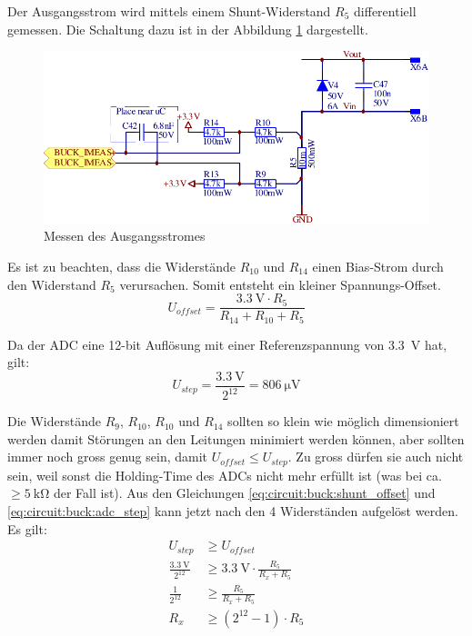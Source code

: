 Der  Ausgangsstrom  wird  mittels  einem  Shunt-Widerstand  $R_5$  differentiell
gemessen.  Die  Schaltung dazu ist in der Abbildung \ref{fig:circuit:buck:imeas}
dargestellt.

\begin{figure}[th!]
    \center
    \includegraphics[width=.85\textwidth]{images/circuit/buck-imeas.pdf}
    \caption{Messen des Ausgangsstromes}
    \label{fig:circuit:buck:imeas}
\end{figure}

Es  ist  zu  beachten,  dass  die  Widerst\"ande  $R_{10}$  und  $R_{14}$  einen
Bias-Strom durch den Widerstand $R_5$  verursachen.  Somit  entsteht ein kleiner
Spannungs-Offset.
\begin{equation}
    U_{offset} = \frac{ \SI{3.3}{\volt} \cdot R_5 }{ R_{14} + R_{10} + R_5 }
    \label{eq:circuit:buck:shunt_offset}
\end{equation}

Da   der   ADC   eine   12-bit   Aufl\"osung   mit  einer  Referenzspannung  von
\SI{3.3}{\volt} hat, gilt:
\begin{equation}
    U_{step} = \frac{\SI{3.3}{\volt}}{2^{12}} = \SI{806}{\micro\volt}
    \label{eq:circuit:buck:adc_step}
\end{equation}

Die Widerst\"ande $R_9$, $R_{10}$, $R_{10}$ und  $R_{14}$  sollten  so klein wie
m\"oglich  dimensioniert  werden damit St\"orungen an  den  Leitungen  minimiert
werden  k\"onnen,  aber  sollten immer noch gross genug sein, damit  $U_{offset}
\leq  U_{step}$.  Zu  gross  d\"urfen  sie  auch  nicht  sein,  weil  sonst  die
Holding-Time  des   ADCs   nicht   mehr   erf\"ullt   ist  (was  bei  ca.  $\geq
\SI{5}{\kilo\ohm}$      der      Fall     ist).     Aus     den      Gleichungen
\ref{eq:circuit:buck:shunt_offset} und \ref{eq:circuit:buck:adc_step} kann jetzt
nach den 4 Widerst\"anden aufgel\"ost werden. Es gilt:
\begin{align*}
                          U_{step} &\geq U_{offset} \\
    \frac{\SI{3.3}{\volt}}{2^{12}} &\geq \SI{3.3}{\volt} \cdot \frac{R_5}{R_x + R_5} \\
                  \frac{1}{2^{12}} &\geq \frac{R_5}{R_x + R_5} \\
                               R_x &\geq \left( 2^{12} - 1 \right) \cdot R_5 \\
\end{align*}

